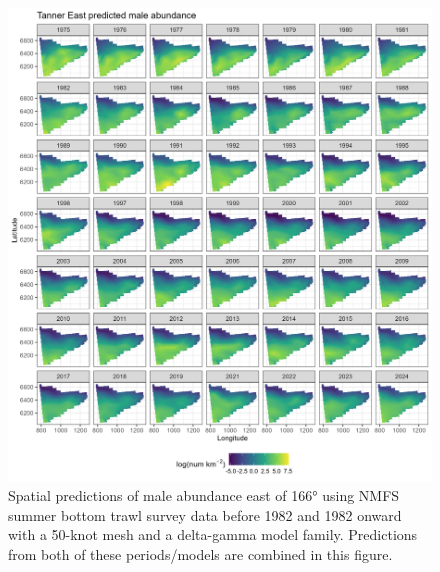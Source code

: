 \documentclass[
]{article}
\begin{document}
\begin{figure}

{\centering \includegraphics[width=1\linewidth,height=1\textheight]{../BAIRDI/Figures/TannerE_male_spatabund} 

}

\caption{Spatial predictions of male abundance east of 166° using NMFS summer bottom trawl survey data before 1982 and 1982 onward with a 50-knot mesh and a delta-gamma model family. Predictions from both of these periods/models are combined in this figure.}\label{fig:spatpred-abund-50-maleE}
\end{figure}
\end{document}
